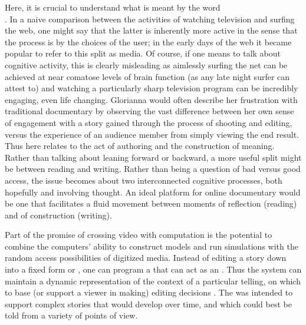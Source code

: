 {Here, it is crucial to understand what is meant by the word\\
. In a naive comparison
between the activities of watching television and surfing the web, one
might say that the latter is inherently more active in the sense that
the process is  by the
choices of the user; in the early days of the web it became popular to
refer to this split as  media. Of course, if one means to talk about
cognitive activity, this is clearly misleading as aimlessly surfing the
net can be achieved at near comatose levels of brain function (as any
late night surfer can attest to) and watching a particularly sharp
television program can be incredibly engaging, even life changing.
Glorianna would often describe her frustration with traditional
documentary by observing the vast difference between her own sense of
engagement with a story gained through the process of shooting and
editing, versus the experience of an audience member from simply
viewing the end result. Thus 
here relates to the act of authoring and the construction of meaning.
Rather than talking about leaning forward or backward, a more useful
split might be between reading and writing. Rather than being a
question of bad versus good access, the issue becomes about two
interconnected cognitive processes, both hopefully
 and involving thought. An
ideal platform for online documentary would be one that facilitates a
fluid movement between moments of reflection (reading) and of
construction (writing).

\page



Part of the promise of crossing video with computation is the potential
to combine the computers' ability to construct models
and run simulations with the random access possibilities of digitized
media. Instead of editing a story down into a fixed form or
, one can program a
 that can act as
an . Thus the
system can maintain a dynamic representation of the context of a
particular telling, on which to base (or support a viewer in making)
editing decisions . The
 was intended
to support complex stories that would develop over time, and which
could best be told from a variety of points of view.

}
